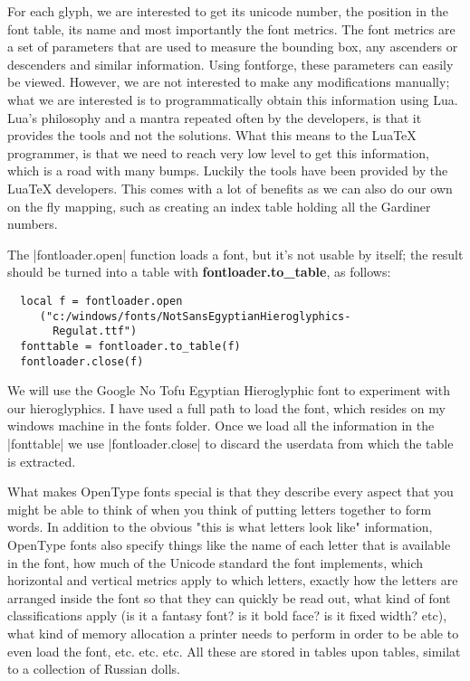 For each glyph, we are interested to get its unicode number, the position in the font table, its name and most importantly the font metrics. The font metrics are a set of parameters that are used to measure the bounding box, any ascenders or descenders and similar information. Using fontforge, these parameters can easily be viewed. However, we are not interested to make any modifications manually; what we are interested is to programmatically obtain this information using Lua. Lua's philosophy and a mantra repeated often by the developers, is that it provides the tools and not the solutions. What this means to the LuaTeX programmer, is that we need to reach very low level  to get this information, which is a road with many bumps. Luckily the tools have been provided by the LuaTeX developers. This comes with a lot of benefits as we can also do our own on the fly mapping, such as creating an index table holding all the Gardiner numbers. 

The |fontloader.open| function loads a font, but it's not usable by itself; the result should be turned into a table with
\textbf{fontloader.to\_table}, as follows:

\begin{verbatim}
  local f = fontloader.open
     ("c:/windows/fonts/NotSansEgyptianHieroglyphics-
       Regulat.ttf")
  fonttable = fontloader.to_table(f)
  fontloader.close(f)
\end{verbatim}

We will use the Google No Tofu Egyptian Hieroglyphic font to experiment with our hieroglyphics. I have used a full path to load the font, which resides on my windows machine in the fonts folder. Once we load all the information in the |fonttable| we use |fontloader.close| to discard the userdata from which the table is extracted. 

What makes OpenType fonts special is that they describe every aspect that you might be able to think of when you think of putting letters together to form words. In addition to the obvious "this is what letters look like" information, OpenType fonts also specify things like the name of each letter that is available in the font, how much of the Unicode standard the font implements, which horizontal and vertical metrics apply to which letters, exactly how the letters are arranged inside the font so that they can quickly be read out, what kind of font classifications apply (is it a fantasy font? is it bold face? is it fixed width? etc), what kind of memory allocation a printer needs to perform in order to be able to even load the font, etc. etc. etc. All these are stored in tables upon tables, similat to a collection of Russian dolls.

